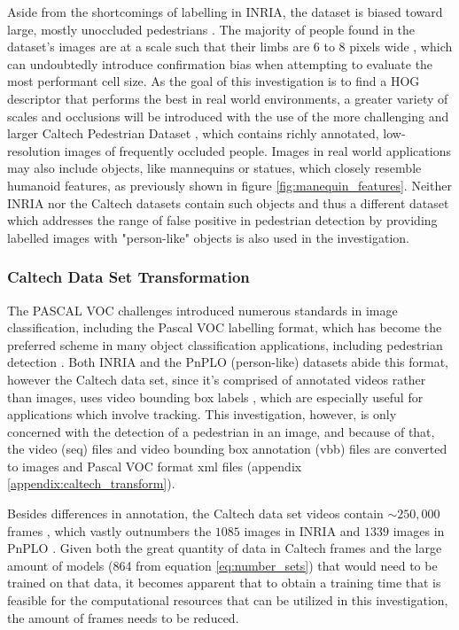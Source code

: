     Aside from the shortcomings of labelling in INRIA, the dataset is biased toward large, mostly unoccluded pedestrians \cite{dollar_2009_pedestrian}. The majority of people found in the dataset’s images are at a scale such that their limbs are 6 to 8 pixels wide \cite{dalal_2005_histograms}, which can undoubtedly introduce confirmation bias when attempting to evaluate the most performant cell size. As the goal of this investigation is to find a HOG descriptor that performs the best in real world environments, a greater variety of scales and occlusions will be introduced with the use of the more challenging and larger Caltech Pedestrian Dataset \cite{dollar_2009_pedestrian}, which contains richly annotated, low-resolution images of frequently occluded people. Images in real world applications may also include objects, like mannequins or statues, which closely resemble humanoid features, as previously shown in figure \ref{fig:manequin_features}. Neither INRIA nor the Caltech datasets contain such objects and thus a different dataset which addresses the range of false positive in pedestrian detection by providing labelled images with "person-like" objects \cite{karthika_2020_addressing} is also used in the investigation.

    \subsubsection{Caltech Data Set Transformation}\label{sec:caltech_trasnform}

    The PASCAL VOC challenges \cite{everingham_2009_pascal} introduced numerous standards in image classification, including the Pascal VOC labelling format, which has become the preferred scheme in many object classification applications, including pedestrian detection \cite{dollar_2012_pedestrian}. Both INRIA and the PnPLO (person-like) datasets abide this format, however the Caltech data set, since it's comprised of annotated videos rather than images, uses video bounding box labels \cite{mathworks_vbbLabeler}, which are especially useful for applications which involve tracking. This investigation, however, is only concerned with the detection of a pedestrian in an image, and because of that, the video (seq) files and video bounding box annotation (vbb) files are converted to images and Pascal VOC format xml files (appendix \ref{appendix:caltech_transform}). 

    Besides differences in annotation, the Caltech data set videos contain $\sim 250,000$ frames \cite{dollar_2009_pedestrian}, which vastly outnumbers the $1085$ images in INRIA \cite{dalal_2005_histograms} and $1339$ images in PnPLO \cite{karthika_2020_addressing}. Given both the great quantity of data in Caltech frames and the large amount of models (864 from equation \ref{eq:number_sets}) that would need to be trained on that data, it becomes apparent that to obtain a training time that is feasible for the computational resources that can be utilized in this investigation, the amount of frames needs to be reduced. 

